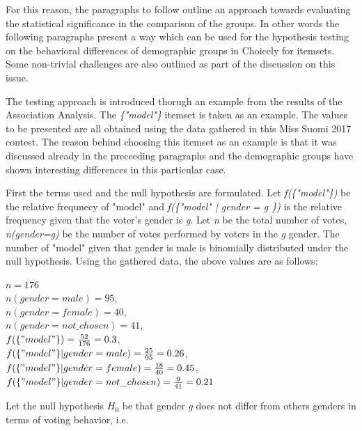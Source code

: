 For this reason, the paragraphs to follow outline an approach towards evaluating the statistical significance in the comparison of the groups. In other words the following paragraphs present a way which can be used for the hypothesis testing on the behavioral differences of demographic groups in Choicely for itemsets. Some non-trivial challenges are also outlined as part of the discussion on this issue. 

The testing approach is introduced thorugh an example from the results of the Association Analysis. The \emph{\{"model"\}} itemset is taken as an example. The values to be presented are all obtained using the data gathered in this Miss Suomi 2017 contest. The reason behind choosing this itemset as an example is that it was discussed already in the preceeding paragraphs and the demographic groups have shown interesting differences in this particular case.

First the terms used and the null hypothesis are formulated. Let \emph{f(\{"model"\})} be the relative frequnecy of "model" and \emph{f(\{"model" | gender = g \})} is the relative frequency given that the voter's gender is \emph{g}. Let \emph{n} be the total number of votes, \emph{n(gender=g)} be the number of votes performed by voters in the \emph{g} gender. The number of "model" given that gender is male is binomially distributed under the null hypothesis. Using the gathered data, the above values are as follows:

\begin{center}
    $n=176$ \\
    $n(gender=male)=95$, \\
    $n(gender=female)=40$, \\
    $n(gender=not\_chosen)=41$, \\
    $f(\{"model"\})=\frac{52}{176}=0.3$, \\ %
    $f(\{"model"\}|gender=male)=\frac{25}{95}=0.26$, \\ %
    $f(\{"model"\}|gender=female)=\frac{18}{40}=0.45$, \\ %
    $f(\{"model"\}|gender=not\_chosen)=\frac{9}{41}=0.21$ %
\end{center}

Let the null hypothesis \emph{$H_0$} be that gender \emph{g} does not differ from others genders in terms of voting behavior, i.e. 


